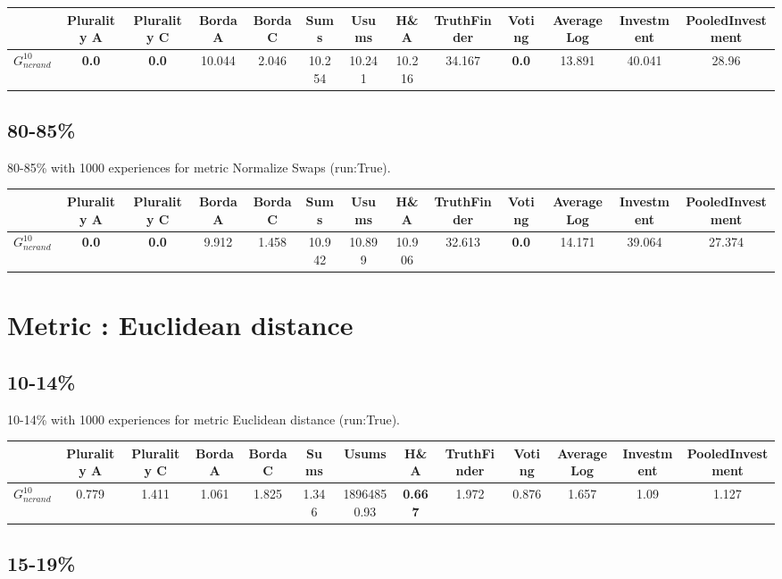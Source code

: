 \documentclass{article}
\newcommand{\graph}[2]{$G_{#1}^{#2}$}
\begin{document}
\noindent\begin{tabular}{|l|c|c|c|c|c|c|c|c|c|c|c|c|}
\hline
& Plurality A& Plurality C& Borda A& Borda C& Sums& Usums& H\&A& TruthFinder& Voting& AverageLog& Investment& PooledInvestment\\
\hline
\graph{ncrand}{10} &\textbf{0.0}&\textbf{0.0}&10.044&2.046&10.254&10.241&10.216&34.167&\textbf{0.0}&13.891&40.041&28.96\\
\hline
\end{tabular}
\newpage

\subsection{80-85\%}

80-85\% with 1000 experiences for metric Normalize Swaps (run:True).

\noindent\begin{tabular}{|l|c|c|c|c|c|c|c|c|c|c|c|c|}
\hline
& Plurality A& Plurality C& Borda A& Borda C& Sums& Usums& H\&A& TruthFinder& Voting& AverageLog& Investment& PooledInvestment\\
\hline
\graph{ncrand}{10} &\textbf{0.0}&\textbf{0.0}&9.912&1.458&10.942&10.899&10.906&32.613&\textbf{0.0}&14.171&39.064&27.374\\
\hline
\end{tabular}
\newpage
\newpage
\section{Metric : Euclidean distance}

\newpage

\subsection{10-14\%}

10-14\% with 1000 experiences for metric Euclidean distance (run:True).

\noindent\begin{tabular}{|l|c|c|c|c|c|c|c|c|c|c|c|c|}
\hline
& Plurality A& Plurality C& Borda A& Borda C& Sums& Usums& H\&A& TruthFinder& Voting& AverageLog& Investment& PooledInvestment\\
\hline
\graph{ncrand}{10} &0.779&1.411&1.061&1.825&1.346&18964850.93&\textbf{0.667}&1.972&0.876&1.657&1.09&1.127\\
\hline
\end{tabular}
\newpage

\subsection{15-19\%}
\end{document}
